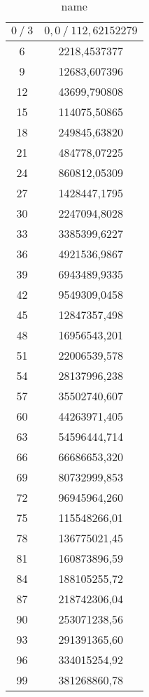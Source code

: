 \begin{table}[H] 
   \centering 
   \caption{name} 
   \label{tab:name} 
   \begin{tabular} { c c } 
 \toprule 
 {$0\:/\: \mathrm{3}$} & {$0,0\:/\: \mathrm{112,62152279}$} \\ 
    \midrule 
    6 & 2218,4537377 \\ 
    9 & 12683,607396 \\ 
    12 & 43699,790808 \\ 
    15 & 114075,50865 \\ 
    18 & 249845,63820 \\ 
    21 & 484778,07225 \\ 
    24 & 860812,05309 \\ 
    27 & 1428447,1795 \\ 
    30 & 2247094,8028 \\ 
    33 & 3385399,6227 \\ 
    36 & 4921536,9867 \\ 
    39 & 6943489,9335 \\ 
    42 & 9549309,0458 \\ 
    45 & 12847357,498 \\ 
    48 & 16956543,201 \\ 
    51 & 22006539,578 \\ 
    54 & 28137996,238 \\ 
    57 & 35502740,607 \\ 
    60 & 44263971,405 \\ 
    63 & 54596444,714 \\ 
    66 & 66686653,320 \\ 
    69 & 80732999,853 \\ 
    72 & 96945964,260 \\ 
    75 & 115548266,01 \\ 
    78 & 136775021,45 \\ 
    81 & 160873896,59 \\ 
    84 & 188105255,72 \\ 
    87 & 218742306,04 \\ 
    90 & 253071238,56 \\ 
    93 & 291391365,60 \\ 
    96 & 334015254,92 \\ 
    99 & 381268860,78 \\ 
    \bottomrule 
  \end{tabular}
\end{table}